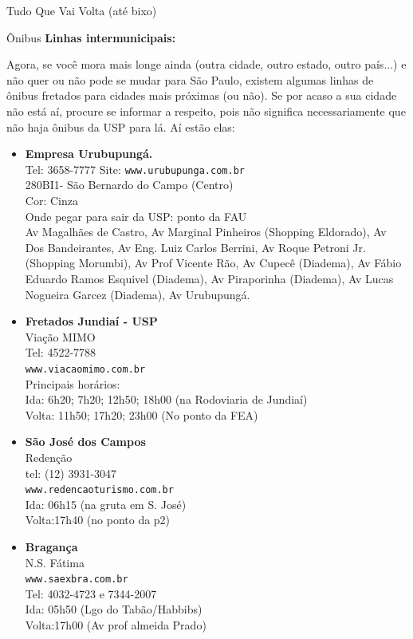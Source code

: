 \begin{secao}{Tudo Que Vai Volta (até bixo)}
\begin{subsecao}{Ônibus}
{\bf Linhas intermunicipais:}

Agora, se você mora mais longe ainda (outra cidade, outro estado, outro país...) e não quer ou não pode se mudar para São Paulo, existem algumas linhas de ônibus fretados para cidades mais próximas (ou não). Se por acaso a sua cidade não está aí, procure se informar a respeito, pois não significa necessariamente que não haja ônibus da USP para lá. Aí estão elas:

\begin{itemize}
  \item {\bf Empresa Urubupungá.}\\
    Tel: 3658-7777
    Site: {\tt www.urubupunga.com.br}\\
    280BI1- São Bernardo do Campo (Centro)\\
    Cor: Cinza\\
    Onde pegar para sair da USP: ponto da FAU\\
    Av Magalhães de Castro, Av Marginal Pinheiros (Shopping Eldorado), Av Dos
    Bandeirantes, Av Eng. Luiz Carlos Berrini, Av Roque Petroni Jr. (Shopping
    Morumbi), Av Prof Vicente Rão, Av Cupecê (Diadema), Av Fábio Eduardo Ramos
    Esquivel (Diadema), Av Piraporinha (Diadema), Av Lucas Nogueira Garcez
    (Diadema), Av Urubupungá.

  \item {\bf Fretados Jundiaí - USP}\\
    Viação MIMO\\
    Tel: 4522-7788\\
    {\tt www.viacaomimo.com.br}\\
    Principais horários:\\
    Ida: 6h20; 7h20; 12h50; 18h00 (na Rodoviaria de Jundiaí)\\
    Volta: 11h50; 17h20; 23h00 (No ponto da FEA)

  \item {\bf São José dos Campos}\\
    Redenção\\
    tel: (12) 3931-3047\\
    {\tt www.redencaoturismo.com.br}\\
    Ida: 06h15 (na gruta em S. José)\\
    Volta:17h40 (no ponto da p2)

  \item {\bf Bragança}\\
    N.S. Fátima\\
    {\tt www.saexbra.com.br}\\
    Tel: 4032-4723 e 7344-2007\\
    Ida: 05h50 (Lgo do Tabão/Habbibs)\\
    Volta:17h00 (Av prof almeida Prado)


\end{itemize}
\end{subsecao}
\end{secao}
